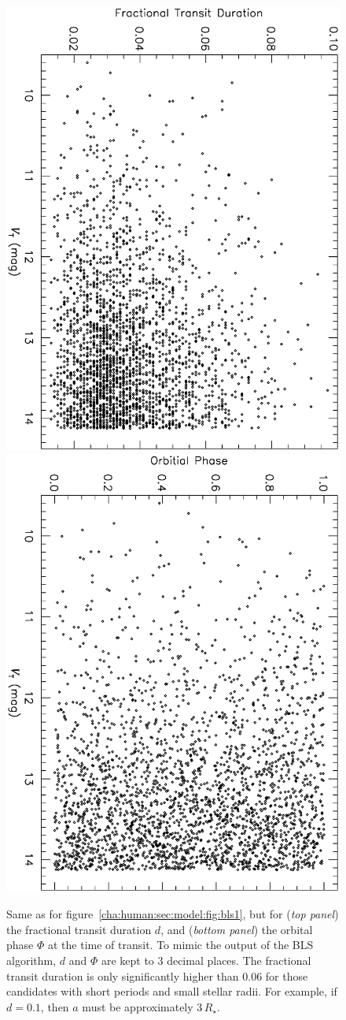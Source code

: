 \begin{figure}
\begin{center}
\centering
\includegraphics[width=.55\textwidth, angle=90]{7_bls_c}\\
\includegraphics[width=.55\textwidth, angle=90]{7_bls_d}\\
\caption[Randomized values for final two BLS parameters]{%
Same as for figure~\ref{cha:human:sec:model:fig:bls1}, but for %
({\it top panel}) the fractional transit duration $d$, and %
({\it bottom panel})  the orbital phase $\Phi$ at the time of transit.
To mimic the output of the BLS algorithm, $d$ and $\Phi$ are kept to 3 decimal places.
The fractional transit duration is only significantly higher than $0.06$ for those candidates with short periods and small stellar radii.
For example, if $d=0.1$, then $a$ must be approximately $3\,R_{\star}$. %
%
}
\label{cha:human:sec:model:fig:bls2}
\end{center}
\end{figure}

